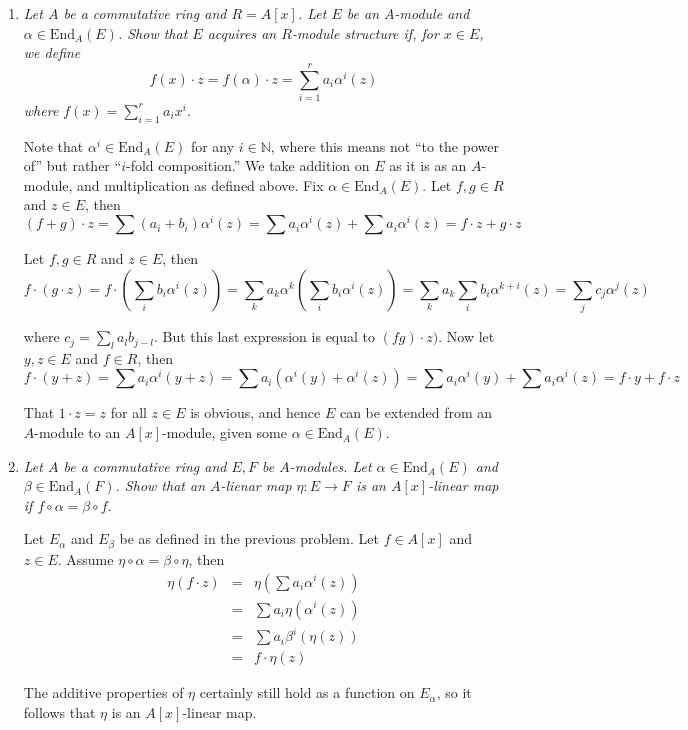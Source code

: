 \documentclass[10pt]{article}
\newcommand{\End}{\text{End}}
\newcommand{\N}{\mathbb{N}}
\begin{document}
\begin{enumerate}
\item \emph{Let $A$ be a commutative ring and $R = A[x]$.  Let $E$ be an $A$-module and $\alpha \in \End_A(E)$.  Show that $E$ acquires an $R$-module structure if, for $x \in E$, we define $$f(x) \cdot z = f(\alpha) \cdot z = \sum_{i=1}^r a_i \alpha^i(z)$$ where $f(x) = \sum_{i=1}^r a_i x^i$.}

Note that $\alpha^i \in \End_A(E)$ for any $i \in \N$, where this means not ``to the power of'' but rather ``$i$-fold composition.''  We take addition on $E$ as it is as an $A$-module, and multiplication as defined above.  Fix $\alpha \in \End_A(E)$.  Let $f,g \in R$ and $z \in E$, then
\[
(f + g) \cdot z = \sum (a_i+b_i) \alpha^i(z) = \sum a_i \alpha^i(z) + \sum a_i \alpha^i(z) = f \cdot z + g \cdot z
\]

Let $f,g \in R$ and $z \in E$, then
\[
f \cdot (g \cdot z) = f \cdot \left(\sum_i b_i \alpha^i(z)\right) = \sum_k a_k \alpha^k\left(\sum_i b_i \alpha^i(z)\right) = \sum_k a_k \sum_i b_i \alpha^{k+i}(z) = \sum_j c_j \alpha^j(z)
\]

where $c_j = \sum_{l} a_l b_{j-l}$.  But this last expression is equal to $(fg) \cdot z)$.  Now let $y,z \in E$ and $f \in R$, then
\[
f \cdot (y + z) = \sum a_i \alpha^i(y+z) = \sum a_i \left(\alpha^i(y) + \alpha^i(z)\right) = \sum a_i \alpha^i(y) + \sum a_i \alpha^i(z) = f \cdot y + f \cdot z
\]

That $1 \cdot z = z$ for all $z \in E$ is obvious, and hence $E$ can be extended from an $A$-module to an $A[x]$-module, given some $\alpha \in \End_A(E)$.

\item \emph{Let $A$ be a commutative ring and $E,F$ be $A$-modules.  Let $\alpha \in \End_A(E)$ and $\beta \in \End_A(F)$.  Show that an $A$-lienar map $\eta: E \rightarrow F$ is an $A[x]$-linear map if $f \circ \alpha = \beta \circ f$. }

Let $E_\alpha$ and $E_\beta$ be as defined in the previous problem. Let $f \in A[x]$ and $z \in E$.  Assume $\eta \circ \alpha = \beta \circ \eta$, then
\begin{eqnarray*}
\eta(f \cdot z) &=& \eta\left(\sum a_i \alpha^i(z)\right) \\
&=&  \sum a_i \eta\left(\alpha^i(z)\right) \\
&=& \sum a_i \beta^i\left(\eta(z)\right) \\
&=& f \cdot \eta(z)
\end{eqnarray*}

The additive properties of $\eta$ certainly still hold as a function on $E_\alpha$, so it follows that $\eta$ is an $A[x]$-linear map.
\end{enumerate}
\end{document}
